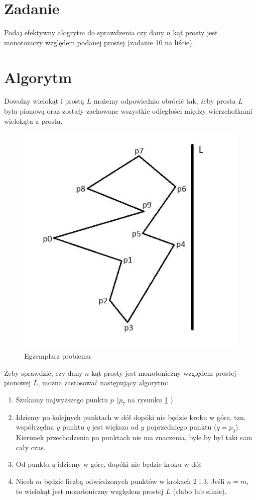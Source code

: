 \documentclass[12pt, a4paper]{article}
\begin{document}
\section*{Zadanie}

Podaj efektywny alogrytm do sprawdzenia czy dany $n$ kąt prosty jest monotoniczy względem podanej prostej (zadanie 10 na liście).
 
\section*{Algorytm}

Dowolny wielokąt i prostą $L$ możemy odpowiednio obrócić tak, żeby prosta $L$ była pionową oraz zostały zachowane wszystkie odległości między wierzchołkami wielokąta a prostą.

\begin{figure}[H]
  \begin{center}
  \includegraphics[scale=0.7]{Sample}
  \caption{Egzemplarz problemu}
  \label{fig:sample}
  \end{center}
\end{figure}

Żeby sprawdzić, czy dany $n$-kąt prosty jest monotoniczny względem prostej pionowej $L$, można zastosować następujący algorytm:

\begin{enumerate}
    \item Szukamy najwyższego punktu $p$ ($p_7$ na rysunku \ref{fig:sample} )
    \item Idziemy po kolejnych punktach w dół dopóki nie będzie kroku w góre, tzn. współrzędna $y$ punktu $q$ jest większa od $y$ poprzedniego punktu ($q = p_3$). Kierunek przechodzenia po punktach nie ma znaczenia, byle by był taki sam cały czas.
    \item Od punktu $q$ idziemy w góre, dopóki nie będzie kroku w dół
    \item Niech $m$ będzie liczbą odwiedzonych punktów w krokach 2 i 3. Jeśli $n = m$, to wielokąt jest monotoniczny względem prostej $L$ (słabo lub silnie).
\end{enumerate}
\end{document}
